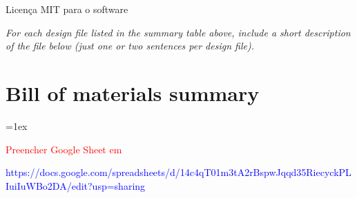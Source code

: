 \documentclass[11pt, letterpaper]{article}
\newcommand{\red}[1]{{\color{red}#1}}
\begin{document}
\red{Licença MIT para o software}

\vskip 0.3cm
\noindent
\textit{For each design file listed in the summary table above, include a short description of the file below (just one or two sentences per design file).}





\section{Bill of materials summary}
\tabulinesep=1ex
\noindent

\textcolor{red}{Preencher Google Sheet em}

\textcolor{blue}{
  https://docs.google.com/spreadsheets/d/14c4qT01m3tA2rBspwJqqd35RiecyckPLIuiIuWBo2DA/edit?usp=sharing}

\end{document}
